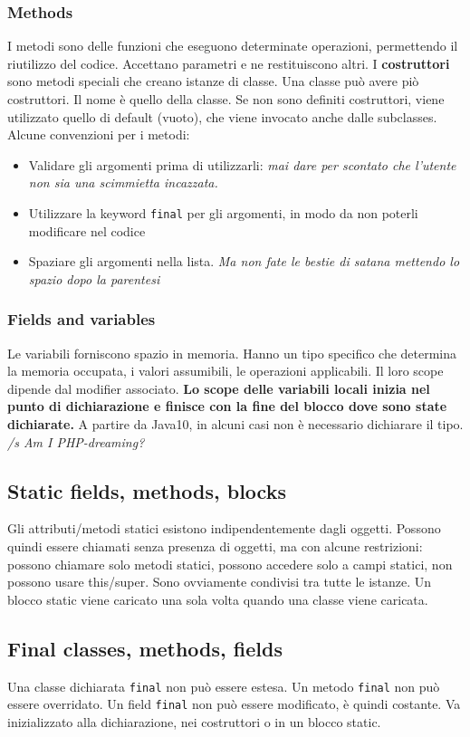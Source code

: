 \documentclass[11pt]{article}
\newcommand{\code}[1]{\texttt{#1}}
\begin{document}
\subsubsection{Methods}
I metodi sono delle funzioni che eseguono determinate operazioni, permettendo il riutilizzo del codice. Accettano parametri e ne restituiscono altri.
I \textbf{costruttori} sono metodi speciali che creano istanze di classe. Una classe può avere piò costruttori. Il nome è quello della classe. Se non sono definiti costruttori, viene utilizzato quello di default (vuoto), che viene invocato anche dalle subclasses.
Alcune convenzioni per i metodi:
\begin{itemize}
    \item Validare gli argomenti prima di utilizzarli: \textit{mai dare per scontato che l'utente non sia una scimmietta incazzata.}
    \item Utilizzare la keyword \code{final} per gli argomenti, in modo da non poterli modificare nel codice
    \item Spaziare gli argomenti nella lista. \textit{Ma non fate le bestie di satana mettendo lo spazio dopo la parentesi}
\end{itemize} 
\subsubsection{Fields and variables}
Le variabili forniscono spazio in memoria. Hanno un tipo specifico che determina la memoria occupata, i valori assumibili, le operazioni applicabili. Il loro scope dipende dal modifier associato. \textbf{Lo scope delle variabili locali inizia nel punto di dichiarazione e finisce con la fine del blocco dove sono state dichiarate.} A partire da Java10, in alcuni casi non è necessario dichiarare il tipo. \textit{/s Am I PHP-dreaming?}
\subsection{Static fields, methods, blocks}
Gli attributi/metodi statici esistono indipendentemente dagli oggetti. Possono quindi essere chiamati senza presenza di oggetti, ma con alcune restrizioni: possono chiamare solo metodi statici, possono accedere solo a campi statici, non possono usare this/super. Sono ovviamente condivisi tra tutte le istanze. Un blocco static viene caricato una sola volta quando una classe viene caricata. 
\subsection{Final classes, methods, fields}
Una classe dichiarata \code{final} non può essere estesa. Un metodo \code{final} non può essere overridato. Un field \code{final} non può essere modificato, è quindi costante. Va inizializzato alla dichiarazione, nei costruttori o in un blocco static. 
\end{document}
